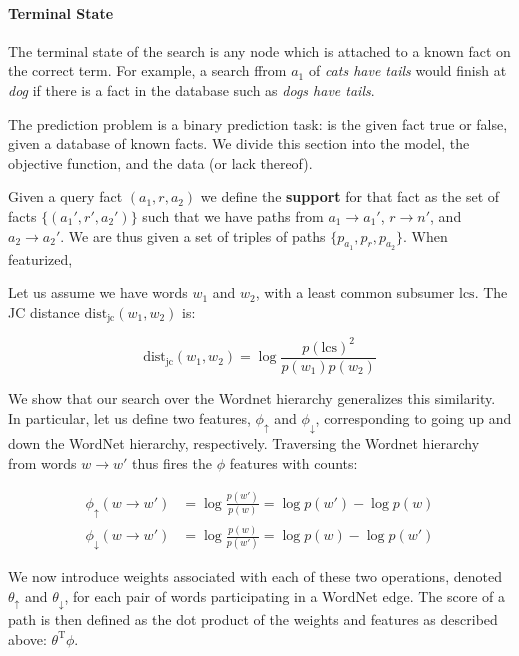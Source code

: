 \documentclass[11pt,a4paper]{article}
\def\w#1{\textit{#1}}
\begin{document}
\paragraph{Terminal State}
The terminal state of the search is any node which
  is attached to a known fact on the correct term.
For example, a search ffrom $a_1$ of \w{cats have tails}
  would finish at \w{dog} if there is a fact in the
  database such as \w{dogs have tails}.


The prediction problem is a binary prediction task: is the given fact true
  or false, given a database of known facts.
We divide this section into the model, the objective function, and the
  data (or lack thereof).

Given a query fact $(a_1, r, a_2)$ we define the \textbf{support} for that
  fact as the set of facts $\{ (a_1', r', a_2') \}$ such that we have
  paths from $a_1 \rightarrow a_1'$, $r \rightarrow n'$,
  and $a_2 \rightarrow a_2'$.
We are thus given a set of triples of paths $\{p_{a_1}, p_{r}, p_{a_2}\}$.
When featurized, 



Let us assume we have words $w_1$ and $w_2$, with a least common subsumer $\textrm{lcs}$.
The JC distance $\textrm{dist}_{\textrm{jc}}(w_1, w_2)$ is:

\begin{equation}
\textrm{dist}_{\textrm{jc}}(w_1, w_2)
  = \log\frac{p(\textrm{lcs})^2}{p(w_1)p(w_2)}
\end{equation}

We show that our search over the Wordnet hierarchy generalizes this similarity.
In particular, let us define two features, $\phi_\uparrow$ and $\phi_\downarrow$,
  corresponding to going up and down the WordNet hierarchy, respectively.
Traversing the Wordnet hierarchy from words $w \rightarrow w'$ thus fires the $\phi$
  features with counts:

\begin{align}
  \phi_\uparrow(w \rightarrow w')
    &= \log\frac{p(w')}{p(w)} = \log p(w') - \log p(w) \\
  \phi_\downarrow(w \rightarrow w')
    &= \log\frac{p(w)}{p(w')} = \log p(w) - \log p(w') 
\end{align}

We now introduce weights associated with each of these two operations, denoted
  $\theta_\uparrow$ and $\theta_\downarrow$, for each pair of words participating
  in a WordNet edge.
The score of a path is then defined as the dot product of the weights and features
  as described above: $\theta^{\textrm{T}}\phi$.
\end{document}
